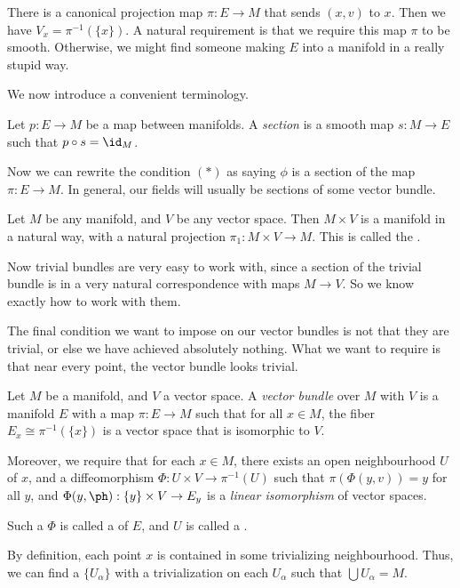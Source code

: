 \documentclass[a4paper]{article}
\begin{document}
There is a canonical projection map $\pi: E \to M$ that sends $(x, v)$ to $x$. Then we have $V_x = \pi^{-1}(\{x\})$. A natural requirement is that we require this map $\pi$ to be smooth. Otherwise, we might find someone making $E$ into a manifold in a really stupid way.

We now introduce a convenient terminology.
\begin{defi}[Section]
  Let $p: E \to M$ be a map between manifolds. A \emph{section} is a smooth map $s: M \to E$ such that $p \circ s = \id_M$.
\end{defi}
Now we can rewrite the condition $(*)$ as saying $\phi$ is a section of the map $\pi: E \to M$. In general, our fields will usually be sections of some vector bundle.

\begin{eg}
  Let $M$ be any manifold, and $V$ be any vector space. Then $M \times V$ is a manifold in a natural way, with a natural projection $\pi_1: M \times V \to M$. This is called the .
\end{eg}

Now trivial bundles are very easy to work with, since a section of the trivial bundle is in a very natural correspondence with maps $M \to V$. So we know exactly how to work with them.

The final condition we want to impose on our vector bundles is not that they are trivial, or else we have achieved absolutely nothing. What we want to require is that near every point, the vector bundle looks trivial.

\begin{defi}
  Let $M$ be a manifold, and $V$ a vector space. A \emph{vector bundle} over $M$ with  $V$ is a manifold $E$ with a map $\pi: E \to M$ such that for all $x \in M$, the fiber $E_x \cong \pi^{-1}(\{x\})$ is a vector space that is isomorphic to $V$.

  Moreover, we require that for each $x \in M$, there exists an open neighbourhood $U$ of $x$, and a diffeomorphism $\Phi: U \times V \to \pi^{-1}(U)$ such that $\pi(\Phi(y, v)) = y$ for all $y$, and $\Phi(y, \ph): \{y\} \times V \to E_y$ is a \emph{linear isomorphism} of vector spaces.

  Such a $\Phi$ is called a  of $E$, and $U$ is called a .
\end{defi}
By definition, each point $x$ is contained in some trivializing neighbourhood. Thus, we can find a  $\{U_\alpha\}$ with a trivialization on each $U_\alpha$ such that $\bigcup U_\alpha = M$.
\end{document}
